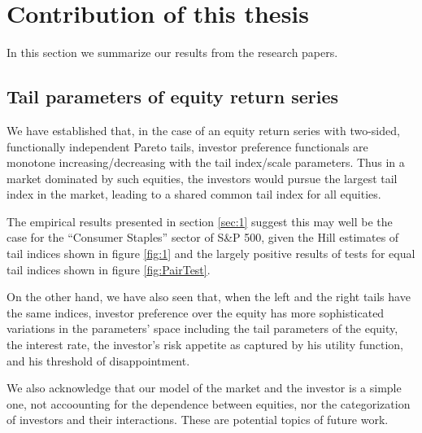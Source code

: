 \section{Contribution of this thesis}\label{sec:contr}

In this section we summarize our results from the research papers.

\subsection{Tail parameters of equity return series}
We have established that, in the case of an equity return series with
two-sided, functionally independent Pareto tails, investor
preference functionals are monotone increasing/decreasing with the
tail index/scale parameters. Thus in a market dominated by such
equities, the investors would pursue the largest tail index in the
market, leading to a shared common tail index for all equities.

The empirical results presented in section \ref{sec:1} suggest this
may well be the case for the ``Consumer Staples'' sector of S\&P 500,
given the Hill estimates of tail indices shown in figure \ref{fig:1}
and the largely positive results of tests for equal tail indices shown
in figure \ref{fig:PairTest}.

On the other hand, we have also seen that, when the left and the right
tails have the same indices, investor preference over the equity has
more sophisticated variations in the parameters' space including the
tail parameters of the equity, the interest rate, the investor's risk
appetite as captured by his utility function, and his threshold of
disappointment.

We also acknowledge that our model of the market and the investor is a
simple one, not accoounting for the dependence between equities, nor
the categorization of investors and their interactions. These are
potential topics of future work.


